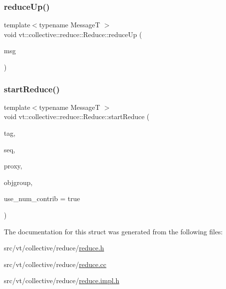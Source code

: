 \subsubsection{\texorpdfstring{reduce\+Up()}{reduceUp()}}
{\footnotesize\ttfamily template$<$typename MessageT $>$ \\
void vt\+::collective\+::reduce\+::\+Reduce\+::reduce\+Up (\begin{DoxyParamCaption}\item[{MessageT $\ast$}]{msg }\end{DoxyParamCaption})\hspace{0.3cm}{\ttfamily [static]}}

\mbox{\label{structvt_1_1collective_1_1reduce_1_1_reduce_af3346be7ab8528e9bc7fe85ac75854f6}} 
\subsubsection{\texorpdfstring{start\+Reduce()}{startReduce()}}
{\footnotesize\ttfamily template$<$typename MessageT $>$ \\
void vt\+::collective\+::reduce\+::\+Reduce\+::start\+Reduce (\begin{DoxyParamCaption}\item[{\hyperlink{namespacevt_a84ab281dae04a52a4b243d6bf62d0e52}{Tag\+Type}}]{tag,  }\item[{\hyperlink{namespacevt_a3063d4db3b879d6dd2c7b8d50995c7f6}{Sequential\+I\+D\+Type}}]{seq,  }\item[{\hyperlink{namespacevt_a1b417dd5d684f045bb58a0ede70045ac}{Virtual\+Proxy\+Type}}]{proxy,  }\item[{\hyperlink{namespacevt_ad7cae989df485fccca57f0792a880a8e}{Obj\+Group\+Proxy\+Type}}]{objgroup,  }\item[{bool}]{use\+\_\+num\+\_\+contrib = {\ttfamily true} }\end{DoxyParamCaption})}



The documentation for this struct was generated from the following files\+:\begin{DoxyCompactItemize}
\item 
src/vt/collective/reduce/\hyperlink{reduce_8h}{reduce.\+h}\item 
src/vt/collective/reduce/\hyperlink{reduce_8cc}{reduce.\+cc}\item 
src/vt/collective/reduce/\hyperlink{reduce_8impl_8h}{reduce.\+impl.\+h}\end{DoxyCompactItemize}
